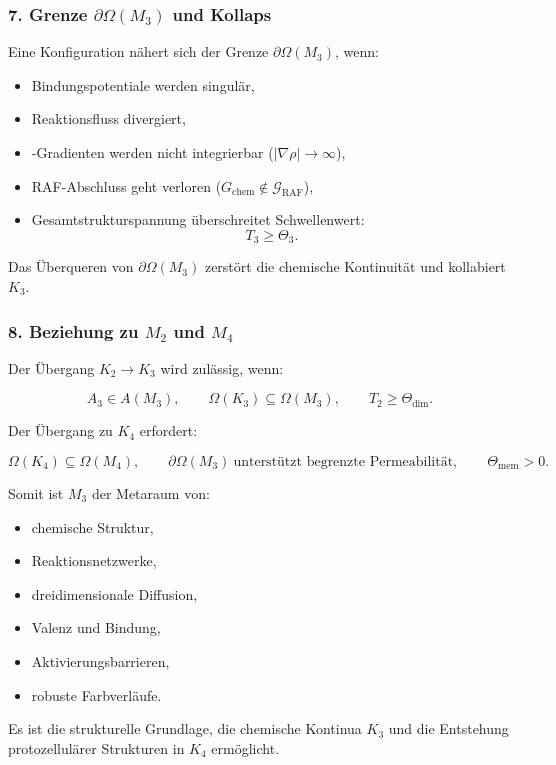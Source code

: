 \subsubsection*{7. Grenze \texorpdfstring{$\partial\Omega(M_3)$}{\partial\Omega(M_3)} und Kollaps}

Eine Konfiguration nähert sich der Grenze $\partial\Omega(M_3)$, wenn:

\begin{itemize}
    \item Bindungspotentiale werden singulär,
    \item Reaktionsfluss divergiert,
    \item-Gradienten werden nicht integrierbar ($|\nabla\rho| \to \infty$),
    \item RAF-Abschluss geht verloren ($G_{\mathrm{chem}} \notin \mathcal{G}_{\mathrm{RAF}}$),
    \item Gesamtstrukturspannung überschreitet Schwellenwert:
    \[
    T_3 \ge \Theta_3.
    \]
\end{itemize}

Das Überqueren von $\partial\Omega(M_3)$ zerstört die chemische Kontinuität und kollabiert $K_3$.

\subsubsection*{8. Beziehung zu \texorpdfstring{$M_2$}{M_2} und \texorpdfstring{$M_4$}{M_4}}

Der Übergang $K_2 \to K_3$ wird zulässig, wenn:

\[
A_3 \in A(M_3),
\qquad
\Omega(K_3) \subseteq \Omega(M_3),
\qquad
T_2 \ge\Theta_{\mathrm{dim}}.
\]

Der Übergang zu $K_4$ erfordert:

\[
\Omega(K_4) \subseteq \Omega(M_4),
\qquad
\partial\Omega(M_3) \ \text{unterstützt begrenzte Permeabilität},
\qquad
\Theta_{\mathrm{mem}} > 0.
\]

Somit ist $M_3$ der Metaraum von:

\begin{itemize}
    \item chemische Struktur,
    \item Reaktionsnetzwerke,
    \item dreidimensionale Diffusion,
    \item Valenz und Bindung,
    \item Aktivierungsbarrieren,
    \item robuste Farbverläufe.
\end{itemize}

Es ist die strukturelle Grundlage, die chemische Kontinua $K_3$ und die Entstehung protozellulärer Strukturen in $K_4$ ermöglicht.
